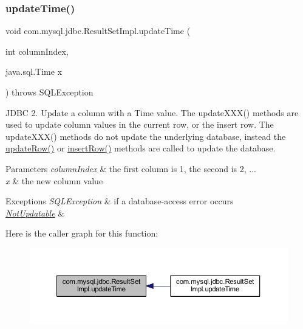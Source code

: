 \subsubsection{\texorpdfstring{update\+Time()}{updateTime()}\hspace{0.1cm}{\footnotesize\ttfamily [1/2]}}
{\footnotesize\ttfamily void com.\+mysql.\+jdbc.\+Result\+Set\+Impl.\+update\+Time (\begin{DoxyParamCaption}\item[{int}]{column\+Index,  }\item[{java.\+sql.\+Time}]{x }\end{DoxyParamCaption}) throws S\+Q\+L\+Exception}

J\+D\+BC 2. Update a column with a Time value. The update\+X\+X\+X() methods are used to update column values in the current row, or the insert row. The update\+X\+X\+X() methods do not update the underlying database, instead the \mbox{\hyperlink{classcom_1_1mysql_1_1jdbc_1_1_result_set_impl_a2842d32292d023aaeeafedeed3322981}{update\+Row()}} or \mbox{\hyperlink{classcom_1_1mysql_1_1jdbc_1_1_result_set_impl_a78e304e3279cbcf60392f18c1385e3bf}{insert\+Row()}} methods are called to update the database.


\begin{DoxyParams}{Parameters}
{\em column\+Index} & the first column is 1, the second is 2, ... \\
\hline
{\em x} & the new column value\\
\hline
\end{DoxyParams}

\begin{DoxyExceptions}{Exceptions}
{\em S\+Q\+L\+Exception} & if a database-\/access error occurs \\
\hline
{\em \mbox{\hyperlink{classcom_1_1mysql_1_1jdbc_1_1_not_updatable}{Not\+Updatable}}} & \\
\hline
\end{DoxyExceptions}
Here is the caller graph for this function\+:
\nopagebreak
\begin{figure}[H]
\begin{center}
\leavevmode
\includegraphics[width=350pt]{classcom_1_1mysql_1_1jdbc_1_1_result_set_impl_adcae140a9e3948cda8cdbd564ba88ed7_icgraph}
\end{center}
\end{figure}
\mbox{\label{classcom_1_1mysql_1_1jdbc_1_1_result_set_impl_a8a8d7908d50f7158ffc333b118a019eb}} 
